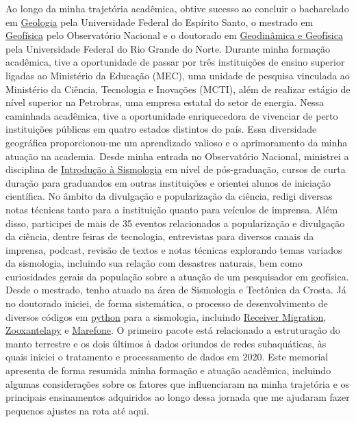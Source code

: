 \documentclass[10pt,a4paper,oneside]{book}
\begin{document}
Ao longo da minha trajetória acadêmica, obtive sucesso ao concluir o bacharelado em \href{https://geologia.ufes.br/}{Geologia} pela Universidade Federal do Espírito Santo, o mestrado em \href{https://www.gov.br/observatorio/pt-br/assuntos/programas-academicos/pos-graduacao-em-geofisica/pos-graduacao-em-geofisica}{Geofísica} pelo Observatório Nacional e o doutorado em \href{https://posgraduacao.ufrn.br/325}{Geodinâmica e Geofísica} pela Universidade Federal do Rio Grande do Norte. Durante minha formação acadêmica, tive a oportunidade de passar por três instituições de ensino superior ligadas ao Ministério da Educação (MEC), uma unidade de pesquisa vinculada ao Ministério da Ciência, Tecnologia e Inovações (MCTI), além de realizar estágio de nível superior na Petrobras, uma empresa estatal do setor de energia. Nessa caminhada acadêmica, tive a oportunidade enriquecedora de vivenciar de perto instituições públicas em quatro estados distintos do país. Essa diversidade geográfica proporcionou-me um aprendizado valioso e o aprimoramento da minha atuação na academia. Desde minha entrada no Observatório Nacional, ministrei a disciplina de \href{https://www.gov.br/observatorio/pt-br/assuntos/programas-academicos/pos-graduacao-em-geofisica/grade-curricular}{Introdução à Sismologia} em nível de pós-graduação, cursos de curta duração para graduandos em outras instituições e orientei alunos de iniciação científica. No âmbito da divulgação e popularização da ciência, redigi diversas notas técnicas tanto para a instituição quanto para veículos de imprensa. Além disso, participei de mais de 35 eventos relacionados a popularização e divulgação da ciência, dentre feiras de tecnologia, entrevistas para diversos canais da imprensa, podcast, revisão de textos e notas técnicas explorando temas variados da sismologia, incluindo sua relação com desastres naturais, bem como curiosidades gerais da população sobre a atuação de um pesquisador em geofísica. Desde o mestrado, tenho atuado na área de Sismologia e Tectônica da Crosta. Já no doutorado iniciei, de forma sistemática, o processo de desenvolvimento de diversos códigos em \href{https://www.python.org/}{python} para a sismologia, incluindo \href{https://github.com/dIOGOLOC/codes_escritos/tree/master/mantle_transition_zone_migration_obspy_Pds}{Receiver Migration}, \href{https://zooxantelapy.readthedocs.io/en/latest/}{Zooxantelapy} e \href{https://github.com/dIOGOLOC/marefone/wiki}{Marefone}. O primeiro pacote está relacionado a estruturação do manto terrestre e os dois últimos à dados oriundos de redes subaquáticas, às quais iniciei o tratamento e processamento de dados em 2020. Este memorial apresenta de forma resumida minha formação e atuação acadêmica, incluindo algumas considerações sobre os fatores que influenciaram na minha trajetória e os principais ensinamentos adquiridos ao longo dessa jornada que me ajudaram fazer pequenos ajustes na rota até aqui.
\end{document}

